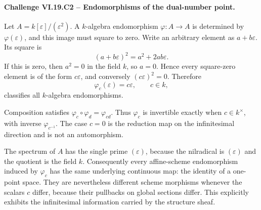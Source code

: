 \paragraph{Challenge VI.19.C2 -- Endomorphisms of the dual-number point.}
\begin{solution}
Let \(A=k[\varepsilon]/(\varepsilon^2)\).  A \(k\)-algebra endomorphism \(\varphi:A\to A\) is determined by \(\varphi(\varepsilon)\), and this image must square to zero.  Write an arbitrary element as \(a+b\varepsilon\).  Its square is
\[
(a+b\varepsilon)^2=a^2+2ab\varepsilon.
\]
If this is zero, then \(a^2=0\) in the field \(k\), so \(a=0\).  Hence every square-zero element is of the form \(c\varepsilon\), and conversely \((c\varepsilon)^2=0\).  Therefore
\[
\varphi_c(\varepsilon)=c\varepsilon,
\qquad c\in k,
\]
classifies all \(k\)-algebra endomorphisms.

Composition satisfies \(\varphi_c\circ\varphi_d=\varphi_{cd}\).  Thus \(\varphi_c\) is invertible exactly when \(c\in k^\times\), with inverse \(\varphi_{c^{-1}}\).  The case \(c=0\) is the reduction map on the infinitesimal direction and is not an automorphism.

The spectrum of \(A\) has the single prime \((\varepsilon)\), because the nilradical is \((\varepsilon)\) and the quotient is the field \(k\).  Consequently every affine-scheme endomorphism induced by \(\varphi_c\) has the same underlying continuous map: the identity of a one-point space.  They are nevertheless different scheme morphisms whenever the scalars \(c\) differ, because their pullbacks on global sections differ.  This explicitly exhibits the infinitesimal information carried by the structure sheaf.
\end{solution}

